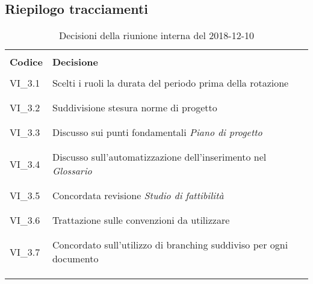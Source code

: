 \subsection{Riepilogo tracciamenti}
\begin{centering}
\begin{longtable}{ >{\centering}p{4cm} >{\centering}p{11cm} }

\hline
\\[0.5pt]
	\textbf{Codice} & \textbf{Decisione} 
	
	\tabularnewline 
	\hline
	
	
				\\[0.5pt]
				VI\_3.1 & Scelti i ruoli la durata del periodo prima della rotazione
				\\[0.5pt]
				\tabularnewline
				\hline
						
				\\[0.5pt]
				VI\_3.2 & Suddivisione stesura norme di progetto
				\\[0.5pt]
				\tabularnewline
				\hline
				
				\\[0.5pt]
				VI\_3.3 & Discusso sui punti fondamentali \textit{Piano di progetto}
				\\[0.5pt]
				\tabularnewline
				\hline
				
				\\[0.5pt]				
				VI\_3.4 & Discusso sull'automatizzazione dell'inserimento nel \textit{Glossario}
				\\[0.5pt]
				\tabularnewline
				\hline
				
				\\[0.5pt]
				VI\_3.5 & Concordata revisione \textit{Studio di fattibilità} 
				\\[0.5pt]
				\tabularnewline
				\hline
				
				\\[0.5pt]
				VI\_3.6 & Trattazione sulle convenzioni da utilizzare
				\\[0.5pt]
				\tabularnewline
				\hline
		
				\\[0.5pt]
				VI\_3.7 & Concordato sull'utilizzo di branching suddiviso per ogni documento
				\\[0.5pt]
				\tabularnewline
				\hline          	
                
        \\[0.7pt]
        \caption{Decisioni della riunione interna del 2018-12-10}
\end{longtable}
\end{centering}

